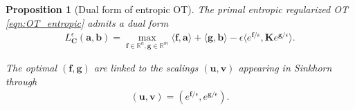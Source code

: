\documentclass[11pt]{book}
\newtheorem{proposition}[theorem]{Proposition}
\begin{document}
\begin{proposition}[Dual form of entropic OT]
    The primal entropic regularized OT \eqref{eqn:OT_entropic} admits a dual form
    \begin{align}\label{eqn:OT_entropic_dual}
        L_\mathbf{C}^\epsilon (\mathbf{a}, \mathbf{b}) = \max_{\mathbf{f} \in \mathbb{R}^n, \mathbf{g} \in \mathbb{R}^m} \langle \mathbf{f}, \mathbf{a} \rangle + \langle \mathbf{g}, \mathbf{b} \rangle - \epsilon \langle e^{\mathbf{f} / \epsilon}, \mathbf{K} e^{\mathbf{g} / \epsilon} \rangle.
    \end{align}
    
    The optimal $(\mathbf{f}, \mathbf{g})$ are linked to the scalings $(\mathbf{u}, \mathbf{v})$ appearing in Sinkhorn through
    \begin{align}\label{eqn:primal_dual_variables}
        (\mathbf{u}, \mathbf{v}) = (e^{\mathbf{f} / \epsilon}, e^{\mathbf{g} / \epsilon}).
    \end{align}
\end{proposition}
    
\end{document}
